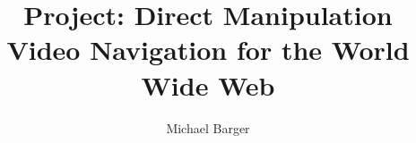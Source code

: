 \documentclass{report}
\begin{document}
\title{Project: Direct Manipulation Video Navigation for the World Wide Web}
\author{Michael Barger}
\maketitle






\end{document}
